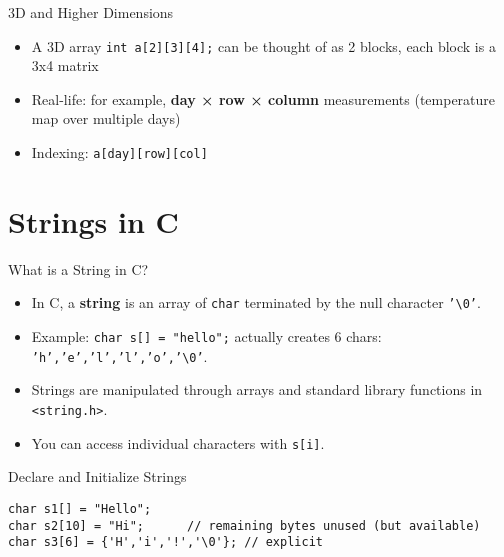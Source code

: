 \documentclass[12pt, aspectratio=169]{beamer}
\begin{document}
    \begin{frame}{3D and Higher Dimensions}
        \begin{itemize}
            \item A 3D array \texttt{int a[2][3][4];} can be thought of as 2 blocks, each block is a 3x4 matrix
            \item Real-life: for example, \textbf{day × row × column} measurements (temperature map over multiple days)
            \item Indexing: \texttt{a[day][row][col]}
        \end{itemize}
    \end{frame}


    \section{Strings in C}


    \begin{frame}{What is a String in C?}
        \begin{itemize}
            \item In C, a \textbf{string} is an array of \texttt{char} terminated by the null character \texttt{'\textbackslash0'}.
            \item Example: \texttt{char s[] = "hello";} actually creates 6 chars: \texttt{'h','e','l','l','o','\textbackslash0'}.
            \item Strings are manipulated through arrays and standard library functions in \texttt{<string.h>}.
            \item You can access individual characters with \texttt{s[i]}.
        \end{itemize}
    \end{frame}

    \begin{frame}[fragile]{Declare and Initialize Strings}
        \begin{verbatim}
char s1[] = "Hello";
char s2[10] = "Hi";      // remaining bytes unused (but available)
char s3[6] = {'H','i','!','\0'}; // explicit
        \end{verbatim}
    \end{frame}
\end{document}
